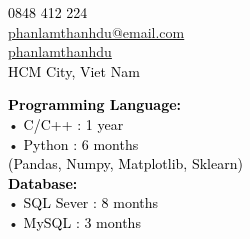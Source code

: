 \documentclass[10pt,a4paper,ragged2e,withhyper]{altacv}
\begin{document}
    \personalinfo{}
    \makecvheader
    \begin{paracol}{2}
        \textcolor{blue}{}  \textcolor{black}{0848 412 224} \hspace{10em} \\
        \vspace{0.8em}
        \textcolor{blue}{} \textcolor{black}{\href{mailto:phanlamthanhdu@email.com}{phanlamthanhdu@email.com}} \\
        \vspace{0.8em}
        \textcolor{blue}{}  \textcolor{black}{\href{https://github.com/phanlamthanhdu}{phanlamthanhdu}}
        \vspace{0.8em} \\
        \textcolor{blue}{} \textcolor{black}{HCM City, Viet Nam}
        
            \textcolor{black}{\textbf{Programming Language:}}\\
            \vspace{0.8em}
            \hspace{3em} • \hspace{0.5em} \textcolor{black}{C/C++ : 1 year} \\
            \vspace{0.5em}
            \hspace{3em} • \hspace{0.5em} \textcolor{black}{Python : 6 months} \\
            \vspace{0.5em}
            \hspace{1.5em} \textcolor{black}{(Pandas, Numpy, Matplotlib, Sklearn)} \\
            \vspace{0.8em}
            \textcolor{black}{\textbf{Database:}} \\
            \vspace{0.8em}
            \hspace{3em} • \hspace{0.5em} \textcolor{black}{SQL Sever : 8 months} \\
            \vspace{0.5em}
            \hspace{3em} • \hspace{0.5em} \textcolor{black}{MySQL : 3 months} \\
            \vspace{0.8em}


\end{paracol}
\end{document}
